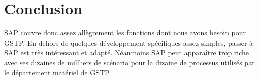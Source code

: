 \section{Conclusion}

SAP couvre donc assez allègrement les fonctions dont nous avons besoin pour GSTP.
En dehors de quelques développement spécifiques assez simples, passer à SAP 
est très intéressant et adapté. Néanmoins SAP peut apparaître trop riche avec ses dizaines 
de millliers de scénario pour la dizaine de processus utilisés par le département matériel de GSTP.
